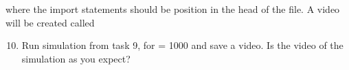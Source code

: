\documentclass{article}
\begin{document}
where the import statements should be position in the head of the file.
A video will be created called 

\begin{enumerate}
  \setcounter{enumi}{9}
  \item Run simulation from task 9, for  = 1000 and save a video.
    Is the video of the simulation as you expect?

\end{enumerate}


\end{document}
